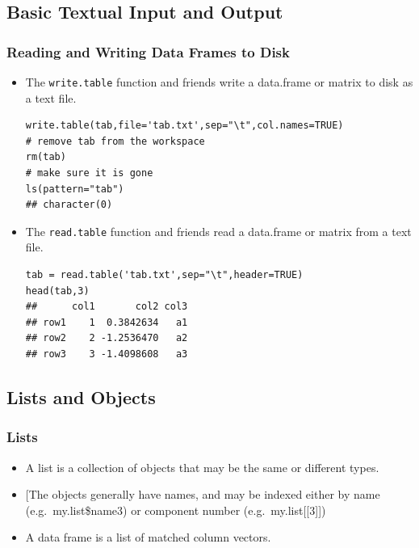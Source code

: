 \documentclass[]{article}
\theoremstyle{definition}
\theoremstyle{definition}
\theoremstyle{remark}
\begin{document}
\subsection{Basic Textual Input and
Output}\label{basic-textual-input-and-output}

\subsubsection{Reading and Writing Data Frames to
Disk}\label{reading-and-writing-data-frames-to-disk}

\begin{itemize}
\item
  {The \texttt{write.table} function and friends write a data.frame or
  matrix to disk as a text file.}

\begin{verbatim}
write.table(tab,file='tab.txt',sep="\t",col.names=TRUE)
# remove tab from the workspace
rm(tab)
# make sure it is gone
ls(pattern="tab")
## character(0)
\end{verbatim}
\item
  {The \texttt{read.table} function and friends read a data.frame or
  matrix from a text file.}

\begin{verbatim}
tab = read.table('tab.txt',sep="\t",header=TRUE)
head(tab,3)
##      col1       col2 col3
## row1    1  0.3842634   a1
## row2    2 -1.2536470   a2
## row3    3 -1.4098608   a3
\end{verbatim}
\end{itemize}

\subsection{Lists and Objects}\label{lists-and-objects}

\subsubsection{Lists}\label{lists}

\begin{itemize}
\item
  {A list is a collection of objects that may be the same or different
  types.}
\item
  {[}The objects generally have names, and may be indexed either by name
  (e.g.~my.list\$name3) or component number (e.g.~my.list{[}{[}3{]}{]})
\item
  {A data frame is a list of matched column vectors.}
\end{itemize}
\end{document}

